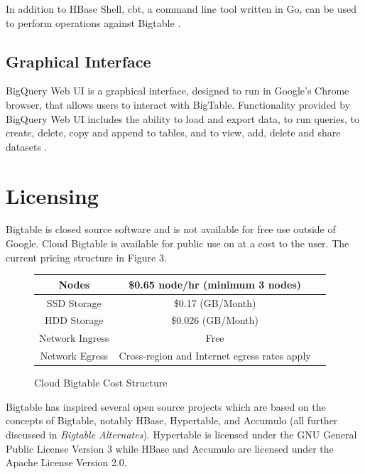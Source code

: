 \documentclass[9pt,twocolumn,twoside]{../../styles/osajnl}
\begin{document}
In addition to HBase Shell, cbt, a command line tool written in Go, can be used to perform operations against Bigtable \cite{www-cbt}. 

\subsection{Graphical Interface}

BigQuery Web UI is a graphical interface, designed to run in Google's Chrome browser, that allows users to interact with BigTable. Functionality provided by BigQuery Web UI includes the ability to load and export data, to run queries, to create, delete, copy and append to tables, and to view, add, delete and share datasets \cite{www-bigquerywebui}.

\section{Licensing}

Bigtable is closed source software and is not available for free use outside of Google. Cloud Bigtable is available for public use on at a cost to the user. The current pricing structure in Figure 3.

\begin{figure}[ht]
\begin{center}
 \begin{tabular} {| c | c | c |}

 \hline
    
Nodes     &    \$0.65 node/hr (minimum 3 nodes) \\
 \hline
SSD Storage     &    \$0.17 (GB/Month)  \\
 \hline
HDD Storage & \$0.026 (GB/Month) \\
 \hline
Network Ingress & Free \\
 \hline
Network Egress & Cross-region and Internet egress rates apply \\
 \hline
\end{tabular}
\end{center}
  \caption{Cloud Bigtable Cost Structure \cite{www-cloudbigtable}} 
\end{figure}

Bigtable has inspired several open source projects which are based on the concepts of Bigtable, notably HBase, Hypertable, and Accumulo (all further discussed in \emph{Bigtable Alternates}). Hypertable is licensed under the GNU General Public License Version 3 while HBase and Accumulo are licensed under the Apache License Version 2.0.
\end{document}
